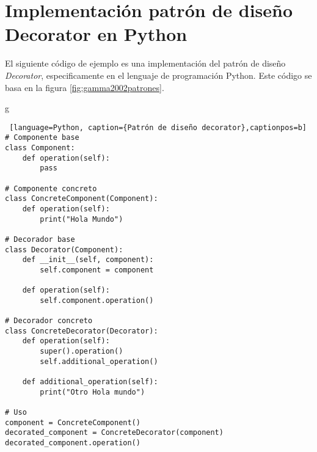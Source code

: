 \chapter{Implementación patrón de diseño Decorator en Python}
\label{finales:apendice2}

El siguiente código de ejemplo es una implementación del patrón de diseño \textit{Decorator}, especificamente en el lenguaje de programación Python. Este código se basa en la figura \ref{fig:gamma2002patrones}.

g\begin{lstlisting} [language=Python, caption={Patrón de diseño decorator},captionpos=b]
# Componente base
class Component:
    def operation(self):
        pass

# Componente concreto
class ConcreteComponent(Component):
    def operation(self):
        print("Hola Mundo")

# Decorador base
class Decorator(Component):
    def __init__(self, component):
        self.component = component

    def operation(self):
        self.component.operation()

# Decorador concreto
class ConcreteDecorator(Decorator):
    def operation(self):
        super().operation()
        self.additional_operation()

    def additional_operation(self):
        print("Otro Hola mundo")

# Uso
component = ConcreteComponent()
decorated_component = ConcreteDecorator(component)
decorated_component.operation()
\end{lstlisting}
